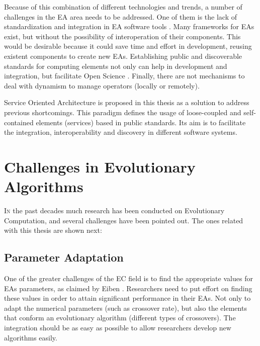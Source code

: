 Because of this combination of different technologies and trends, %
a number of challenges in the EA area needs to be addressed.  One of
them is the lack of standardization and integration in EA software
tools \cite{SURVEYMOFS}. Many frameworks for EAs exist, but without
the possibility of interoperation of their components. 
This would be desirable because it could save time and effort in 
development, reusing existent components to create new EAs. %
Establishing public and discoverable standards for computing elements
not only can help in development and integration, but facilitate Open
Science \cite{Foster2005Science}. Finally, there are not mechanisms to
deal with dynamism to manage operators (locally or remotely). %

Service Oriented Architecture \cite{Papazoglou2007SOA} is proposed in
this thesis as a solution to address previous shortcomings. This
paradigm defines the usage of loose-coupled and self-contained
elements (services) based in public standards. Its aim is to facilitate
the integration, interoperability and discovery in different software
systems. 


\section{Challenges in Evolutionary Algorithms}
\label{sec:intro:challenges}

\lettrine{I}{n} the past decades much research has been conducted on Evolutionary Computation, and several challenges have been pointed out. The ones related with this thesis are shown next:

\subsection{Parameter Adaptation}

One of the greater challenges of the EC field is to find the appropriate values for EAs parameters, as claimed by {\person Eiben \etal} 
\cite{Eiben12Parameters}. Researchers need to put effort on finding these values in order to
attain significant performance in their EAs. Not only to adapt the numerical parameters (such as crossover rate), but also the elements that conform an evolutionary algorithm (different types of crossovers). The integration should be as easy as possible to allow researchers develop new algorithms easily. 


